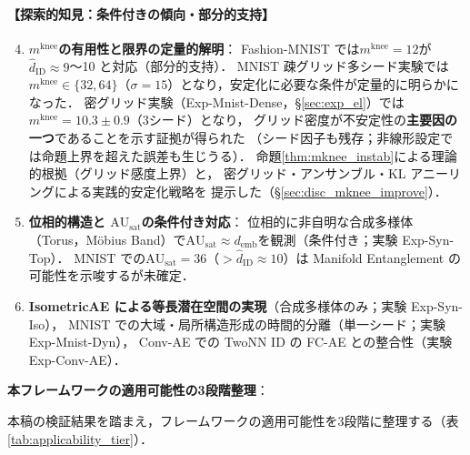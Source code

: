 \documentclass[11pt,a4paper]{jsarticle}
\newcommand{\AUsat}{\mathrm{AU}_{\mathrm{sat}}}
\newcommand{\mknee}{m^{\mathrm{knee}}}
\newcommand{\demb}{d_{\mathrm{emb}}}
\begin{document}
\paragraph{【探索的知見：条件付きの傾向・部分的支持】}
\begin{enumerate}
  \setcounter{enumi}{3}
  \item \textbf{$\mknee$の有用性と限界の定量的解明}：
        Fashion-MNIST では$\mknee = 12$が$\hat{d}_\mathrm{ID} \approx 9$〜10 と対応（部分的支持）．
        MNIST 疎グリッド多シード実験では$\mknee \in \{32, 64\}$（$\sigma=15$）となり，安定化に必要な条件が定量的に明らかになった．
        密グリッド実験（Exp-Mnist-Dense，§\ref{sec:exp_el}）では
        $\mknee = 10.3 \pm 0.9$（3シード）となり，
        グリッド密度が不安定性の\textbf{主要因の一つ}であることを示す証拠が得られた
        （シード因子も残存；非線形設定では命題上界を超えた誤差も生じうる）．
        命題\ref{thm:mknee_instab}による理論的根拠（グリッド感度上界）と，
        密グリッド・アンサンブル・KL アニーリングによる実践的安定化戦略を
        提示した（§\ref{sec:disc_mknee_improve}）．
  \item \textbf{位相的構造と $\AUsat$の条件付き対応}：
        位相的に非自明な合成多様体（Torus，Möbius Band）で$\AUsat \approx \demb$を観測（条件付き；実験 Exp-Syn-Top）．
        MNIST での$\AUsat = 36$（$> \hat{d}_\mathrm{ID} \approx 10$）は Manifold Entanglement の可能性を示唆するが未確定．
  \item \textbf{IsometricAE による等長潜在空間の実現}（合成多様体のみ；実験 Exp-Syn-Iso），
        MNIST での大域・局所構造形成の時間的分離（単一シード；実験 Exp-Mnist-Dyn），
        Conv-AE での TwoNN ID の FC-AE との整合性（実験 Exp-Conv-AE）．
\end{enumerate}

\textbf{本フレームワークの適用可能性の3段階整理}：

本稿の検証結果を踏まえ，フレームワークの適用可能性を3段階に整理する（表\ref{tab:applicability_tier}）．
\end{document}

